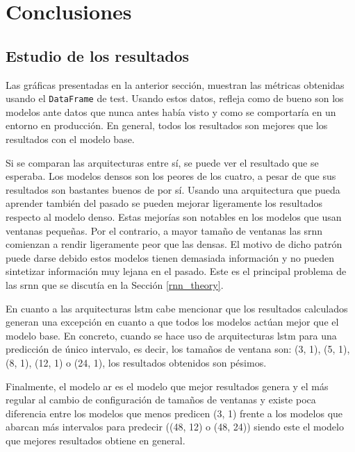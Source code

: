 \section{Conclusiones}

\subsection{Estudio de los resultados}

Las gráficas presentadas en la anterior sección, muestran las métricas obtenidas usando el \small\verb|DataFrame| de test. Usando estos datos, refleja como de bueno son los modelos ante datos que nunca antes había visto y como se comportaría en un entorno en producción. En general, todos los resultados son mejores que los resultados con el modelo base.
\newline

Si se comparan las arquitecturas entre sí, se puede ver el resultado que se esperaba. Los modelos densos son los peores de los cuatro, a pesar de que sus resultados son bastantes buenos de por sí. Usando una arquitectura que pueda aprender también del pasado se pueden mejorar ligeramente los resultados respecto al modelo denso. Estas mejorías son notables en los modelos que usan ventanas pequeñas. Por el contrario, a mayor tamaño de ventanas las \acrshort{srnn} comienzan a rendir ligeramente peor que las densas. El motivo de dicho patrón puede darse debido estos modelos tienen demasiada información y no pueden sintetizar información muy lejana en el pasado. Este es el principal problema de las \acrshort{srnn} que se discutía en la Sección \ref{rnn_theory}.
\newline

En cuanto a las arquitecturas \acrshort{lstm} cabe mencionar que los resultados calculados generan una excepción en cuanto a que todos los modelos actúan mejor que el modelo base. En concreto, cuando se hace uso de arquitecturas \acrshort{lstm} para una predicción de único intervalo, es decir, los tamaños de ventana son: (3, 1), (5, 1), (8, 1), (12, 1) o (24, 1), los resultados obtenidos son pésimos.
\newline

Finalmente, el modelo \acrlong{ar} es el modelo que mejor resultados genera y el más regular al cambio de configuración de tamaños de ventanas y existe poca diferencia entre los modelos que menos predicen (3, 1) frente a los modelos que abarcan más intervalos para predecir ((48, 12) o (48, 24)) siendo este el modelo que mejores resultados obtiene en general.
\newline

